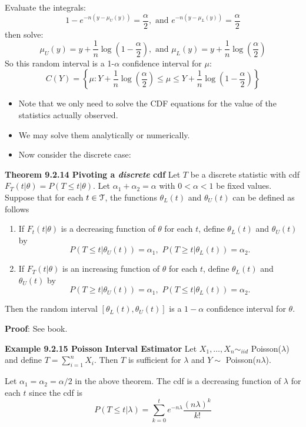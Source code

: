 \documentclass[11pt,]{article}
\newcommand{\Xndots}{X_1, \ldots, X_n}
\def\Tsc{{\cal T}}
\def\sumin{\sum_{i=1}^n}
\begin{document}
Evaluate the integrals:
\[1 - e^{-n(y-\mu_U(y))} = \frac{\alpha}{2},  \mbox{ and } e^{-n(y-\mu_L(y))} = \frac{\alpha}{2}\]
then solve:
\[ \mu_U(y) = y + \frac{1}{n} \log\left( 1 - \frac{\alpha}{2}\right),\mbox{ and }\mu_L(y) = y + \frac{1}{n} \log\left( \frac{\alpha}{2}\right)\]
So this random interval is a 1-\(\alpha\) confidence interval for
\(\mu\):
\[C(Y) = \left\{ \mu: Y + \frac{1}{n}\log\left( \frac{\alpha}{2}\right) \leq \mu \leq Y +\frac{1}{n} \log\left( 1 - \frac{\alpha}{2}\right)\right\}\]

\begin{itemize}
\item Note that we only need to solve the CDF equations for the value of the statistics actually observed.
\item We may solve them analytically or numerically.
\item Now consider the discrete case:
\end{itemize}

\noindent\textbf{Theorem 9.2.14 Pivoting a {\em discrete} cdf} Let \(T\)
be a discrete statistic with cdf
\(F_T(t|\theta) = P(T \leq t | \theta)\). Let
\(\alpha_1 + \alpha_2 = \alpha\) with \(0< \alpha < 1\) be fixed values.
Suppose that for each \(t \in \Tsc\), the functions \(\theta_{L}(t)\)
and \(\theta_{U}(t)\) can be defined as follows

\begin{enumerate}
\def\labelenumi{\roman{enumi}.}
\item
  If \(F_t(t|\theta)\) is a decreasing function of \(\theta\) for each
  \(t\), define \(\theta_{L}(t)\) and \(\theta_{U}(t)\) by
  \[P(T \leq t|\theta_{U}(t)) = \alpha_1, \,\, P(T \geq t|\theta_{L}(t))  = \alpha_2.\]
\item
  If \(F_T(t|\theta)\) is an increasing function of \(\theta\) for each
  \(t\), define \(\theta_{L}(t)\) and \(\theta_{U}(t)\) by
  \[P(T \geq t|\theta_{U}(t)) = \alpha_1, \, \, P(T \leq t|\theta_{L}(t))  = \alpha_2.\]
\end{enumerate}

Then the random interval \([\theta_{L}(t),\theta_{U}(t)]\) is a
\(1-\alpha\) confidence interval for \(\theta\).

\textbf{Proof}: See book.

\noindent\textbf{Example 9.2.15 Poisson Interval Estimator} Let
\(\Xndots \sim_{iid}\) Poisson(\(\lambda\)) and define
\(T = \sumin X_i.\) Then \(T\) is sufficient for \(\lambda\) and
\(Y\sim\) Poisson(\(n\lambda\)).

Let \(\alpha_1 = \alpha_2 = \alpha/2\) in the above theorem. The cdf is
a decreasing function of \(\lambda\) for each \(t\) since the cdf is
\[P(T\leq t | \lambda) = \sum_{k=0}^{t} e^{-n\lambda}\frac{(n\lambda)^k}{k!}\]
\end{document}
